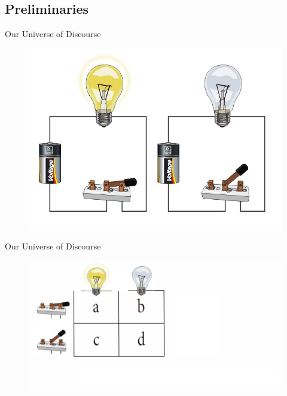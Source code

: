 \documentclass{beamer}
\begin{document}
\subsection*{Preliminaries}
\begin{frame}{Our Universe of Discourse}
	\begin{figure}
	\begin{center}
		\includegraphics[width=\linewidth]{lightbulb}
	\end{center}
	\end{figure}
\end{frame}

\begin{frame}{Our Universe of Discourse}
	\begin{figure}
	\begin{center}
		\includegraphics[width=\linewidth]{light_table}
	\end{center}
\end{figure}
\end{frame}
\end{document}
